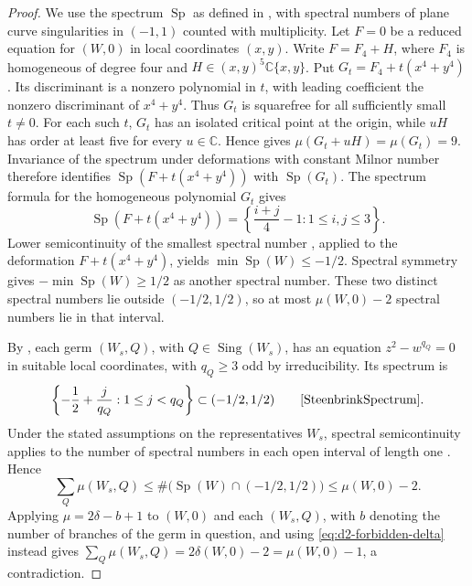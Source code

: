 \documentclass[11pt,letterpaper]{article}
\numberwithin{equation}{section}
\theoremstyle{remark}
\theoremstyle{plain}
\newcommand{\C}{\mathbb{C}}
\begin{document}
\begin{proof}
We use the spectrum $\operatorname{Sp}$ as defined in
\cite[(2.1)]{SteenbrinkSemicontinuity}, with spectral numbers of
plane curve singularities in $(-1,1)$ counted with multiplicity.
Let $F=0$ be a reduced equation for $(W,0)$ in local coordinates $(x,y)$.
Write $F=F_4+H$,
where $F_4$ is homogeneous of degree four and
$H\in(x,y)^5\C\{x,y\}$.
Put $G_t=F_4+t(x^4+y^4)$.
Its discriminant is a nonzero polynomial in $t$, with leading
coefficient the nonzero discriminant of $x^4+y^4$.
Thus $G_t$ is squarefree for all sufficiently small $t\neq0$.
For each such $t$, $G_t$ has an isolated critical point at the origin,
while $uH$ has order at least five for every $u\in\C$.  Hence
\cite[Corollary~I.2.18]{GreuelLossenShustin} gives
$\mu(G_t+uH)=\mu(G_t)=9$.
Invariance of the spectrum under deformations with constant Milnor
number \cite[Theorem~2.8]{SteenbrinkSemicontinuity}
therefore identifies $\operatorname{Sp}(F+t(x^4+y^4))$ with
$\operatorname{Sp}(G_t)$.  The spectrum formula for the homogeneous polynomial $G_t$
\cite[p.~165]{SteenbrinkSpectrum} gives
\[
 \operatorname{Sp}(F+t(x^4+y^4))
 =\left\{\frac{i+j}{4}-1:1\leq i,j\leq3\right\}.
\]
Lower semicontinuity of the smallest spectral number
\cite[Theorem~2.11]{SteenbrinkSemicontinuity}, applied to
the deformation $F+t(x^4+y^4)$, yields
$\min\operatorname{Sp}(W)\leq-1/2$.
Spectral symmetry \cite[p.~167]{SteenbrinkSpectrum} gives
$-\min\operatorname{Sp}(W)\geq1/2$ as another spectral number.
These two distinct spectral numbers lie outside $(-1/2,1/2)$,
so at most $\mu(W,0)-2$ spectral numbers lie in that interval.

By \cite[Theorem~I.2.48]{GreuelLossenShustin}, each germ
$(W_s,Q)$, with $Q\in\operatorname{Sing}(W_s)$, has an
equation $z^2-w^{q_Q}=0$ in suitable local coordinates, with
$q_Q\geq3$ odd by irreducibility.
Its spectrum is
\[
 \left\{-\frac12+\frac j{q_Q}:1\leq j<q_Q\right\}
 \subset(-1/2,1/2)
 \qquad\text{\cite[p.~165]{SteenbrinkSpectrum}}.
\]
Under the stated assumptions on the representatives $W_s$,
spectral semicontinuity applies to the number of spectral numbers
in each open interval of length one
\cite[Remark~2.10]{SteenbrinkSemicontinuity}.  Hence
\[
 \sum_Q\mu(W_s,Q)
 \leq\#\bigl(\operatorname{Sp}(W)\cap(-1/2,1/2)\bigr)
 \leq\mu(W,0)-2.
\]
Applying $\mu=2\delta-b+1$ to $(W,0)$ and each $(W_s,Q)$, with
$b$ denoting the number of branches of the germ in question, and using
\eqref{eq:d2-forbidden-delta} instead gives
$\sum_Q\mu(W_s,Q)=2\delta(W,0)-2=\mu(W,0)-1$, a contradiction.
\end{proof}
\end{document}

